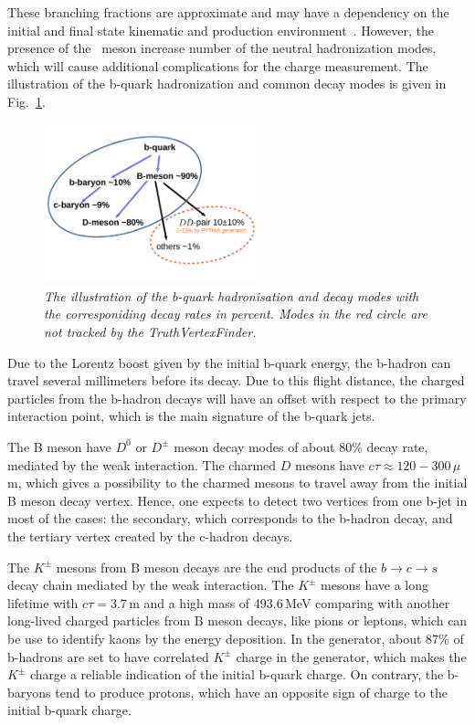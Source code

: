 These branching fractions are approximate and may have a dependency on the initial and final state kinematic and production environment~\cite{bib:PDG}.
However, the presence of the \Bzs\ meson increase number of the neutral hadronization modes, which will cause additional complications for the charge measurement. 
The illustration of the b-quark hadronization and common decay modes is given in Fig.~\ref{fig:Bmodes_3}.
\begin{figure}[h]
	{\centering
		\includegraphics[width=0.55\textwidth]{ILD/plots/b-modes}
		\caption{\sl The illustration of the b-quark hadronisation and decay modes with the corresponiding decay rates in percent. Modes in the red circle are not tracked by the TruthVertexFinder.}
		\label{fig:Bmodes_3}
	}
\end{figure}

Due to the Lorentz boost given by the initial b-quark energy, the b-hadron can travel several millimeters before its decay. Due to this flight distance, the charged particles from the b-hadron decays will have an offset with respect to the primary interaction point, which is the main signature of the b-quark jets. 

The B meson have $D^0$ or $D^\pm$ meson decay modes of about 80\% decay rate, mediated by the weak interaction. The charmed $D$ mesons have $c\tau \approx 120 - 300$\,$\mu$m, which gives a possibility to the charmed mesons to travel away from the initial B meson decay vertex. 
Hence, one expects to detect two vertices from one b-jet in most of the cases: the secondary, which corresponds to the b-hadron decay, and the tertiary vertex created by the c-hadron decays. 

The $K^\pm$ mesons from B meson decays are the end products of the $b\to c\to s$ decay chain mediated by the weak interaction. 
The $K^\pm$ mesons have a long lifetime with $c\tau = 3.7$\,m and a high mass of 493.6\,MeV comparing with another long-lived charged particles from B meson decays, like pions or leptons, which can be use to identify kaons by the energy deposition. 
In the generator, about 87\% of b-hadrons are set to have correlated $K^\pm$ charge in the generator, which makes the $K^\pm$ charge a reliable indication of the initial b-quark charge.
On contrary, the b-baryons tend to produce protons, which have an opposite sign of charge to the initial b-quark charge. 

